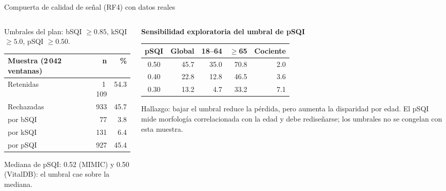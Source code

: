 \documentclass[aspectratio=169]{beamer}
\begin{document}
\begin{frame}{Compuerta de calidad de señal (RF4) con datos reales}
  \begin{columns}[T]
    \begin{column}{0.48\textwidth}
      \small
      Umbrales del plan: bSQI $\ge 0.85$, kSQI $\ge 5.0$, pSQI $\ge 0.50$.

      \vspace{0.4em}
      \begin{tabular}{lrr}
        \toprule
        Muestra (2\,042 ventanas) & n & \% \\
        \midrule
        Retenidas & 1\,109 & 54.3 \\
        Rechazadas & 933 & 45.7 \\
        \quad por bSQI & 77 & 3.8 \\
        \quad por kSQI & 131 & 6.4 \\
        \quad por pSQI & 927 & 45.4 \\
        \bottomrule
      \end{tabular}

      \vspace{0.4em}
      Mediana de pSQI: 0.52 (MIMIC) y 0.50 (VitalDB): el umbral cae sobre la mediana.
    \end{column}
    \begin{column}{0.48\textwidth}
      \small
      \textbf{Sensibilidad exploratoria del umbral de pSQI}

      \begin{tabular}{crrrr}
        \toprule
        pSQI & Global & 18--64 & $\ge$65 & Cociente \\
        \midrule
        0.50 & 45.7 & 35.0 & 70.8 & 2.0 \\
        0.40 & 22.8 & 12.8 & 46.5 & 3.6 \\
        0.30 & 13.2 & 4.7 & 33.2 & 7.1 \\
        \bottomrule
      \end{tabular}

      \vspace{0.4em}
      \alert{Hallazgo:} bajar el umbral reduce la pérdida, pero aumenta la disparidad por edad.
      El pSQI mide morfología correlacionada con la edad y debe rediseñarse; los umbrales no se
      congelan con esta muestra.
    \end{column}
  \end{columns}
\end{frame}
\end{document}
